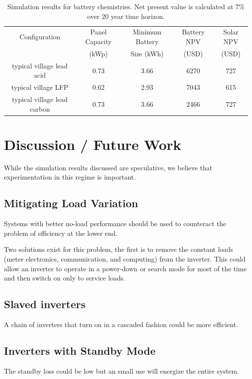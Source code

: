 \documentclass[conference]{IEEEtran}
\begin{document}
\begin{table}[!t]
\centering
\begin{tabular}{ c c c c c }
Configuration & Panel Capacity & Minimum Battery & Battery NPV & Solar NPV \\
              & (kWp)          & Size (kWh)      & (USD)       & (USD)     \\
\hline
typical village lead acid      & 0.73 & 3.66 & 6270 & 727 \\
typical village LFP            & 0.62 & 2.93 & 7043 & 615 \\
typical village lead carbon    & 0.73 & 3.66 & 2466 & 727 \\
\end{tabular}
\caption{Simulation results for battery chemistries.
Net present value is calculated at 7\% over 20 year 
time horizon.}
\label{table_battery}
\end{table}


\section{Discussion / Future Work}
While the simulation results discussed are speculative, 
we believe that experimentation in this regime is important.

\subsection{Mitigating Load Variation}
Systems with better no-load performance should be used to counteract
the problem of efficiency at the lower end.

Two solutions exist for this problem, the first is to remove
the constant loads (meter electronics, communication, and
computing) from the inverter.
This could allow an inverter to operate in a power-down or
search mode for most of the time and then switch on only
to service loads.

\subsection{Slaved inverters}
A chain of inverters that turn on in a cascaded fashion could
be more efficient.

\subsection{Inverters with Standby Mode}
The standby loss could be low but an small use will energize the
entire system.
\end{document}
